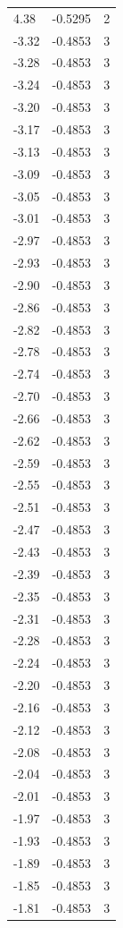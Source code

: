 \begin{longtable}{lrr}
  4.38 & -0.5295 & 2 \\
  -3.32 & -0.4853 & 3 \\
  -3.28 & -0.4853 & 3 \\
  -3.24 & -0.4853 & 3 \\
  -3.20 & -0.4853 & 3 \\
  -3.17 & -0.4853 & 3 \\
  -3.13 & -0.4853 & 3 \\
  -3.09 & -0.4853 & 3 \\
  -3.05 & -0.4853 & 3 \\
  -3.01 & -0.4853 & 3 \\
  -2.97 & -0.4853 & 3 \\
  -2.93 & -0.4853 & 3 \\
  -2.90 & -0.4853 & 3 \\
  -2.86 & -0.4853 & 3 \\
  -2.82 & -0.4853 & 3 \\
  -2.78 & -0.4853 & 3 \\
  -2.74 & -0.4853 & 3 \\
  -2.70 & -0.4853 & 3 \\
  -2.66 & -0.4853 & 3 \\
  -2.62 & -0.4853 & 3 \\
  -2.59 & -0.4853 & 3 \\
  -2.55 & -0.4853 & 3 \\
  -2.51 & -0.4853 & 3 \\
  -2.47 & -0.4853 & 3 \\
  -2.43 & -0.4853 & 3 \\
  -2.39 & -0.4853 & 3 \\
  -2.35 & -0.4853 & 3 \\
  -2.31 & -0.4853 & 3 \\
  -2.28 & -0.4853 & 3 \\
  -2.24 & -0.4853 & 3 \\
  -2.20 & -0.4853 & 3 \\
  -2.16 & -0.4853 & 3 \\
  -2.12 & -0.4853 & 3 \\
  -2.08 & -0.4853 & 3 \\
  -2.04 & -0.4853 & 3 \\
  -2.01 & -0.4853 & 3 \\
  -1.97 & -0.4853 & 3 \\
  -1.93 & -0.4853 & 3 \\
  -1.89 & -0.4853 & 3 \\
  -1.85 & -0.4853 & 3 \\
  -1.81 & -0.4853 & 3 \\

\end{longtable}

